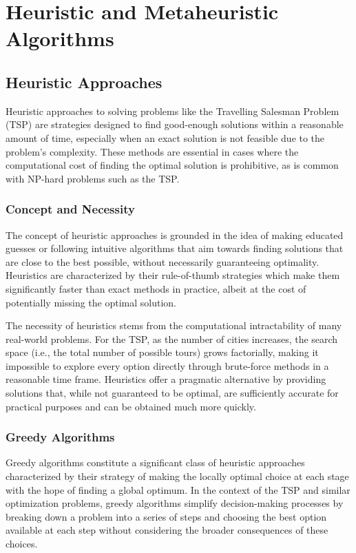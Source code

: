 \chapter{Heuristic and Metaheuristic Algorithms}\label{chapt:4}

\section{Heuristic Approaches}
Heuristic approaches to solving problems like the Travelling Salesman Problem (TSP) are strategies designed to find good-enough solutions within a reasonable amount of time, especially when an exact solution is not feasible due to the problem's complexity. These methods are essential in cases where the computational cost of finding the optimal solution is prohibitive, as is common with NP-hard problems such as the TSP.

\subsection{Concept and Necessity}
The concept of heuristic approaches is grounded in the idea of making educated guesses or following intuitive algorithms that aim towards finding solutions that are close to the best possible, without necessarily guaranteeing optimality. Heuristics are characterized by their rule-of-thumb strategies which make them significantly faster than exact methods in practice, albeit at the cost of potentially missing the optimal solution.

The necessity of heuristics stems from the computational intractability of many real-world problems. For the TSP, as the number of cities increases, the search space (i.e., the total number of possible tours) grows factorially, making it impossible to explore every option directly through brute-force methods in a reasonable time frame. Heuristics offer a pragmatic alternative by providing solutions that, while not guaranteed to be optimal, are sufficiently accurate for practical purposes and can be obtained much more quickly.


\subsection{Greedy Algorithms}

Greedy algorithms constitute a significant class of heuristic approaches characterized by their strategy of making the locally optimal choice at each stage with the hope of finding a global optimum. In the context of the TSP and similar optimization problems, greedy algorithms simplify decision-making processes by breaking down a problem into a series of steps and choosing the best option available at each step without considering the broader consequences of these choices.

